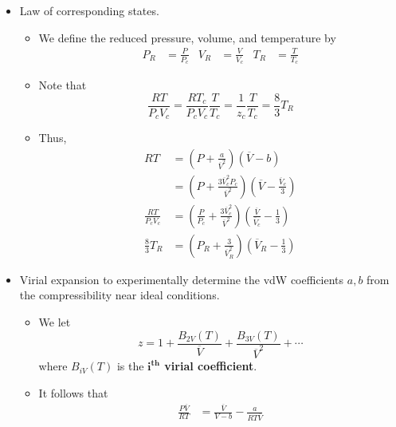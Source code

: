 \documentclass[../notes.tex]{subfiles}
\begin{document}
\begin{itemize}
\begin{itemize}
\begin{itemize}
        \end{itemize}
    \end{itemize}
    \item Law of corresponding states.
    \begin{itemize}
        \item We define the reduced pressure, volume, and temperature by
        \begin{align*}
            P_R &= \frac{P}{P_c}&
            V_R &= \frac{V}{V_c}&
            T_R &= \frac{T}{T_c}
        \end{align*}
        \item Note that
        \begin{equation*}
            \frac{RT}{P_cV_c} = \frac{RT_c}{P_cV_c}\frac{T}{T_c}
            = \frac{1}{z_c}\frac{T}{T_c}
            = \frac{8}{3}T_R
        \end{equation*}
        \item Thus,
        \begin{align*}
            RT &= \left( P+\frac{a}{\overline{V}^2} \right)(\overline{V}-b)\\
            &= \left( P+\frac{3\overline{V}_c^2P_c}{\overline{V}^2} \right)\left( \overline{V}-\frac{\overline{V}_c}{3} \right)\\
            \frac{RT}{P_cV_c} &= \left( \frac{P}{P_c}+\frac{3\overline{V}_c^2}{\overline{V}^2} \right)\left( \frac{\overline{V}}{\overline{V}_c}-\frac{1}{3} \right)\\
            \frac{8}{3}T_R &= \left( P_R+\frac{3}{\overline{V}_R^2} \right)\left( \overline{V}_R-\frac{1}{3} \right)
        \end{align*}
    \end{itemize}
    \item Virial expansion to experimentally determine the vdW coefficients $a,b$ from the compressibility near ideal conditions.
    \begin{itemize}
        \item We let
        \begin{equation*}
            z = 1+\frac{B_{2V}(T)}{\overline{V}}+\frac{B_{3V}(T)}{\overline{V}^2}+\cdots
        \end{equation*}
        where $B_{iV}(T)$ is the \textbf{$\bm{i^\textbf{th}}$ virial coefficient}.
        \item It follows that
        \begin{align*}
            \frac{P\overline{V}}{RT} &= \frac{\overline{V}}{V-b}-\frac{a}{RT\overline{V}}\\

\end{align*}
\end{itemize}
\end{itemize}
\end{document}
